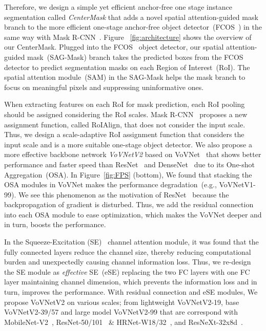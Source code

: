 \documentclass[10pt,twocolumn,letterpaper]{article}
\begin{document}
Therefore, we design a simple yet efficient anchor-free one stage instance segmentation called \textit{CenterMask} that adds a novel spatial attention-guided mask branch to the more efficient one-stage anchor-free object detector~(FCOS~\cite{Tian_2019_ICCV}) in the same way with Mask R-CNN~\cite{he2017mask}. 
Figure ~\ref{fig:architecture} shows the overview of our CenterMask.
Plugged into the FCOS~\cite{Tian_2019_ICCV} object detector, our spatial attention-guided mask~(SAG-Mask) branch takes the predicted boxes from the FCOS~\cite{Tian_2019_ICCV} detector to predict segmentation masks on each Region of Interest~(RoI).
The spatial attention module~(SAM) in the SAG-Mask helps the mask branch to focus on meaningful pixels and suppressing uninformative ones.  

When extracting features on each RoI for mask prediction, each RoI pooling should be assigned considering the RoI scales. 
Mask R-CNN~\cite{he2017mask} proposes a new assignment function, called RoIAlign, that does not consider the input scale.
Thus, we design a scale-adaptive RoI assignment function that considers the input scale and is a more suitable one-stage object detector.
We also propose a more effective backbone network \textit{VoVNetV2} based on VoVNet~\cite{lee2019energy} that shows better performance and faster speed than ResNet~\cite{he2016deep} and DenseNet~\cite{huang2017densely} due to its One-shot Aggregation~(OSA).
In Figure~\ref{fig:FPS} (bottom), We found that stacking the OSA modules in VoVNet makes the performance degradation~(e.g., VoVNetV1-99). We see this phenomenon as the motivation of ResNet~\cite{he2016deep} because the backpropagation of gradient is disturbed.
Thus, we add the residual connection~\cite{he2016deep} into each OSA module to ease optimization, which makes the VoVNet deeper and in turn, boosts the performance.

In the Squeeze-Excitation (SE)~\cite{hu2018squeeze} channel attention module, it was found that the fully connected layers reduce the channel size, thereby reducing computational burden and unexpectedly causing channel information loss.
Thus, we re-design the SE module as \textit{effective} SE~(eSE) replacing the two FC layers with one FC layer maintaining channel dimension, which prevents the information loss and in turn, improves the performance.
With residual connection and eSE modules, We propose VoVNetV2 on various scales; from lightweight VoVNetV2-19, base VoVNetV2-39/57 and large model VoVNetV2-99 that are correspond with MobileNet-V2~\cite{howard2017mobilenets}, ResNet-50/101~\cite{he2016deep} \& HRNet-W18/32~\cite{sun2019high}, and ResNeXt-32x8d~\cite{xie2017aggregated}.
\end{document}
